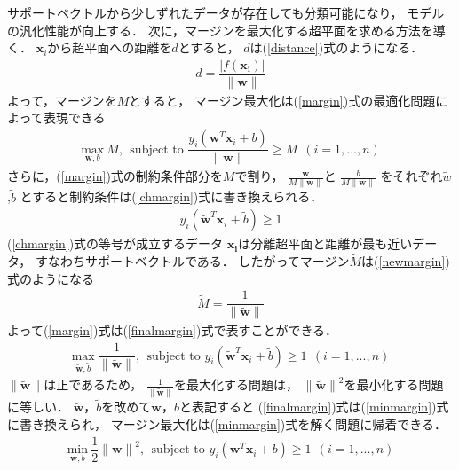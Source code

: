 サポートベクトルから少しずれたデータが存在しても分類可能になり，
モデルの汎化性能が向上する．
次に，マージンを最大化する超平面を求める方法を導く．
$\boldsymbol{x}_i$から超平面への距離を$d$とすると，
$d$は(\ref{distance})式のようになる．
\begin{align}
    \label{distance}
d = \dfrac{|f(\boldsymbol{x_i})|}{\|\boldsymbol{w}\| }
\end{align}
よって，マージンを$M$とすると，
マージン最大化は(\ref{margin})式の最適化問題によって表現できる
\begin{align}
    \label{margin}
    \underset{{\boldsymbol{w},b}}{\text{max}}~M,~~ \text{subject to } \dfrac{y_i(\boldsymbol{w}^T \boldsymbol{x}_i + b)}{\|\boldsymbol{w}\|}
    \geq M ~~  (i=1,...,n)
\end{align}
さらに，(\ref{margin})式の制約条件部分を$M$で割り，
$\frac{\boldsymbol{w}}{M\|\boldsymbol{w}\|}$と
$\frac{b}{M\|\boldsymbol{w}\|}$
をそれぞれ$\tilde{w}$,$\tilde{b}$
とすると制約条件は(\ref{chmargin})式に書き換えられる．
\begin{align}
    \label{chmargin}
    y_i(\boldsymbol{\tilde{w}}^T \boldsymbol{x}_i + \tilde{b}) \geq 1
\end{align}
(\ref{chmargin})式の等号が成立するデータ
$\boldsymbol{x_i}$は分離超平面と距離が最も近いデータ，
すなわちサポートベクトルである．
したがってマージン$\tilde{M}$は(\ref{newmargin})式のようになる
\begin{align}
    \label{newmargin}
   \tilde{M} = \dfrac{1}{\|\boldsymbol{\tilde{w}}\|}
\end{align}
よって(\ref{margin})式は(\ref{finalmargin})式で表すことができる．
\begin{align}
    \label{finalmargin}
    \underset{\boldsymbol{\tilde{w}},\tilde{b}}{\text{max}}~\dfrac{1}{\|\boldsymbol{\tilde{w}}\|},
  ~~ \text{subject to } y_i(\boldsymbol{\tilde{w}}^T \boldsymbol{x}_i + \tilde{b}) \geq 1~~  (i=1,...,n)
\end{align}
$\|\boldsymbol{\tilde{w}}\|$は正であるため，
$\frac{1}{\|\boldsymbol{\tilde{w}}\|}$を最大化する問題は，
${\|\boldsymbol{\tilde{w}}\|}^2$を最小化する問題に等しい．
$\boldsymbol{\tilde{w}}$，$\tilde{b}$を改めて$\boldsymbol{w}$，$b$と表記すると
(\ref{finalmargin})式は(\ref{minmargin})式に書き換えられ，
マージン最大化は(\ref{minmargin})式を解く問題に帰着できる．
\begin{align}
    \label{minmargin}
    \underset{\boldsymbol{w},b}{\text{min}}~\dfrac{1}{2}{\|\boldsymbol{{w}}\|}^2,
  ~~ \text{subject to } y_i(\boldsymbol{w}^T \boldsymbol{x}_i + b) \geq 1~~  (i=1,...,n)
\end{align}
